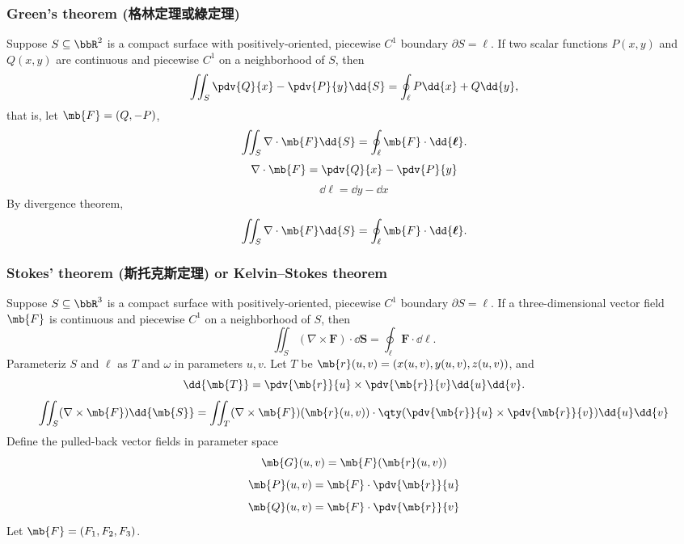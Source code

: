 \subsubsection{Green's theorem (格林定理或綠定理)}
Suppose $S\subseteq\bbR^2$ is a compact surface with positively-oriented, piecewise $C^1$ boundary $\partial S=\ell$. If two scalar functions $P(x,y)$ and $Q(x,y)$ are continuous and piecewise $C^1$ on a neighborhood of $S$, then
\[\iint_S\pdv{Q}{x}-\pdv{P}{y}\dd{S}=\oint_{\ell}P\dd{x}+Q\dd{y},\]
that is, let $\mb{F}=(Q,-P)$,
\[\iint_S\nabla\cdot\mb{F}\dd{S}=\oint_{\ell}\mb{F}\cdot\dd{\boldsymbol{\ell}}.\]
\bpr
\[\nabla\cdot\mb{F}=\pdv{Q}{x}-\pdv{P}{y}\]
\[\dd{\boldsymbol{\ell}}=\dd{y}-\dd{x}\]
By divergence theorem,
\[\iint_S\nabla\cdot\mb{F}\dd{S}=\oint_{\ell}\mb{F}\cdot\dd{\boldsymbol{\ell}}.\]
\epr
\subsubsection{Stokes' theorem (斯托克斯定理) or Kelvin–Stokes theorem}
Suppose $S\subseteq\bbR^3$ is a compact surface with positively-oriented, piecewise $C^1$ boundary $\partial S=\ell$. If a three-dimensional vector field $\mb{F}$ is continuous and piecewise $C^1$ on a neighborhood of $S$, then
\[\iint_S(\nabla\times\mathbf{F})\cdot \dd{\mathbf{S}}=\oint_{\ell}\mathbf{F}\cdot\dd{\boldsymbol{\ell}}.\]
\bpr
Parameteriz $S$ and $\ell$ as $T$ and $\omega$ in parameters $u,v$. Let $T$ be $\mb{r}(u,v)=(x(u,v),y(u,v),z(u,v))$, and
\[\dd{\mb{T}}=\pdv{\mb{r}}{u}\times\pdv{\mb{r}}{v}\dd{u}\dd{v}.\]
\[\iint_S(\nabla\times\mb{F})\dd{\mb{S}}=\iint_T(\nabla\times\mb{F})(\mb{r}(u,v))\cdot\qty(\pdv{\mb{r}}{u}\times\pdv{\mb{r}}{v})\dd{u}\dd{v}\]
Define the pulled-back vector fields in parameter space
\[\mb{G}(u,v)=\mb{F}(\mb{r}(u,v))\]
\[\mb{P}(u,v)=\mb{F}\cdot\pdv{\mb{r}}{u}\]
\[\mb{Q}(u,v)=\mb{F}\cdot\pdv{\mb{r}}{v}\]
Let $\mb{F}=(F_1,F_2,F_3)$.
